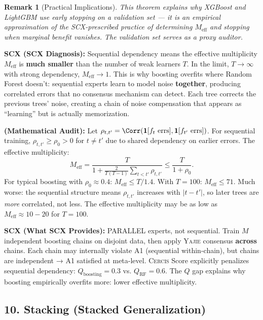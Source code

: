 \documentclass[12pt,a4paper]{article}
\newtheorem{remark}[theorem]{Remark}
\theoremstyle{definition}
\newcommand{\Yajie}{\textsc{Yajie}}
\newcommand{\Cercis}{\textsc{Cercis}}
\newcommand{\SCX}{\textsc{SCX}}
\newcommand{\ind}[1]{\mathbf{1}[#1]}
\newcommand{\whatMissing}{\noindent\textbf{SCX (What SCX Provides):} }
\newcommand{\diagnosis}{\noindent\textbf{SCX (SCX Diagnosis):} }
\newcommand{\mathAudit}{\noindent\textbf{ (Mathematical Audit):} }
\begin{document}
\begin{remark}[Practical Implications]
This theorem explains why XGBoost and LightGBM use early stopping on a validation set — it is an empirical approximation of the \SCX{}-prescribed practice of determining $M_{\text{eff}}$ and stopping when marginal benefit vanishes. The validation set serves as a proxy auditor.
\end{remark}

\diagnosis{} Sequential dependency means the effective multiplicity $M_{\text{eff}}$ is \textbf{much smaller} than the number of weak learners $T$. In the limit, $T \to \infty$ with strong dependency, $M_{\text{eff}} \to 1$. This is why boosting overfits where Random Forest doesn't: sequential experts learn to model noise \textbf{together}, producing correlated errors that no consensus mechanism can detect. Each tree corrects the previous trees' noise, creating a chain of noise compensation that appears as ``learning'' but is actually memorization.

\mathAudit{} Let $\rho_{t,t'} = \Corr(\ind{f_t \text{ errs}}, \ind{f_{t'} \text{ errs}})$. For sequential training, $\rho_{t,t'} \ge \rho_0 > 0$ for $t \neq t'$ due to shared dependency on earlier errors. The effective multiplicity:
\[
M_{\text{eff}} = \frac{T}{1 + \frac{2}{T(T-1)}\sum_{t<t'}\rho_{t,t'}} \le \frac{T}{1 + \rho_0}.
\]
For typical boosting with $\rho_0 \approx 0.4$: $M_{\text{eff}} \le T/1.4$. With $T=100$: $M_{\text{eff}} \le 71$. Much worse: the sequential structure means $\rho_{t,t'}$ increases with $|t-t'|$, so later trees are \textit{more} correlated, not less. The effective multiplicity may be as low as $M_{\text{eff}} \approx 10-20$ for $T=100$.

\whatMissing{} PARALLEL experts, not sequential. Train $M$ independent boosting chains on disjoint data, then apply \Yajie{} consensus \textbf{across} chains. Each chain may internally violate A1 (sequential within-chain), but chains are independent → A1 satisfied at meta-level. \Cercis{} Score explicitly penalizes sequential dependency: $Q_{\text{boosting}} = 0.3$ vs. $Q_{\text{RF}} = 0.6$. The $Q$ gap explains why boosting empirically overfits more: lower effective multiplicity.

\subsection{10. Stacking (Stacked Generalization) }
\end{document}
